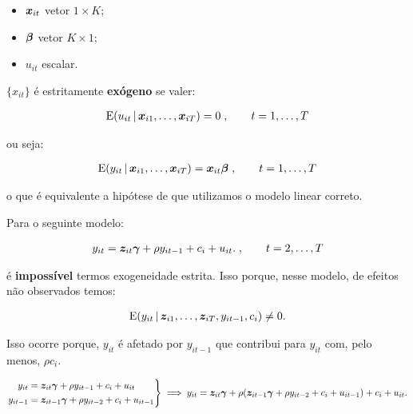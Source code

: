 \documentclass[11pt, oneside, a4paper, article]{article}
\numberwithin{equation}{section}
\begin{document}
\begin{description}
\begin{itemize}
		\item
			$\boldsymbol{x}_{it}$  vetor $1 \times K$;

		\item
			$\boldsymbol{\beta}$ vetor $K \times 1$;

		\item
			$u_{it}$ escalar.
	\end{itemize}

	\noindent
	$\{x_{it}\}$ é estritamente \textbf{exógeno} se valer:

	\vspace{-1 em}
	\begin{align*}
		\text{E}( u_{it} \, | \, \boldsymbol{x}_{i1}, \dots, \boldsymbol{x}_{iT} ) = 0 \; , \qquad t = 1, \dots, T
	\end{align*}

	\noindent
	ou seja:

	\vspace{-1 em}
	\begin{align*}
		\text{E}( y_{it} \, | \, \boldsymbol{x}_{i1}, \dots, \boldsymbol{x}_{iT} ) = \boldsymbol{x}_{it} \boldsymbol{\beta} 
		\; , \qquad t = 1, \dots, T
	\end{align*}

	\noindent
	o que é equivalente a hipótese de que utilizamos o modelo linear correto.

	Para o seguinte modelo:

	\vspace{-1.5 em}
	\begin{align*}
		y_{it} = \boldsymbol{z}_{it} \boldsymbol{\gamma} + \rho y_{i t - 1} + c_{i} + u_{it}.
		\; , \qquad t = 2, \dots, T
	\end{align*}

	\noindent
	é \textbf{impossível} termos exogeneidade estrita.
	Isso porque, nesse modelo, de efeitos não observados temos:

	\vspace{-1.5 em}
	\begin{align*}
		\text{E}( y_{it} \, | \, \boldsymbol{z}_{i1}, \dots, \boldsymbol{z}_{iT}, y_{it-1}, c_{i}) \neq 0.
	\end{align*}

	\noindent
	Isso ocorre porque, $y_{it}$ é afetado por $y_{it-1}$ que contribui para $y_{it}$ com, pelo menos, $\rho c_{i}$.

	\begin{equation*}
		\left.
			\begin{aligned}
				y_{it} &= \boldsymbol{z}_{it} \boldsymbol{\gamma} + \rho y_{i t - 1} + c_{i} + u_{it}
				\\
				y_{it-1} &= \boldsymbol{z}_{it-1} \boldsymbol{\gamma} + \rho y_{i t - 2} + c_{i} + u_{it-1}
			\end{aligned}
		\right\} 
		\implies
		y_{it} = \boldsymbol{z}_{it} \boldsymbol{\gamma} +
		\rho (\boldsymbol{z}_{it-1} \boldsymbol{\gamma} + \rho y_{i t - 2} + c_{i} + u_{it-1})
		+ c_{i} + u_{it}.
	\end{equation*}


\end{description}
\end{document}
